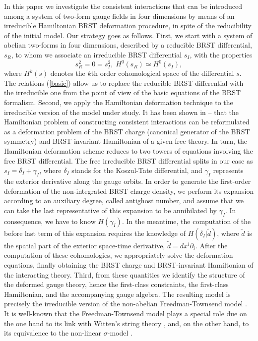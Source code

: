 \documentclass[a4paper,12pt]{article}
\begin{document}
In this paper we investigate the consistent interactions that can be
introduced among a system of two-form gauge fields in four dimensions by
means of an irreducible Hamiltonian BRST deformation procedure, in spite of
the reducibility of the initial model. Our strategy goes as follows. First,
we start with a system of abelian two-forms in four dimensions, described by
a reducible BRST differential, $s_{R}$, to whom we associate an irreducible
BRST differential $s_{I}$, with the properties 
\begin{equation}
s_{R}^{2}=0=s_{I}^{2},\;H^{0}\left( s_{R}\right) \simeq H^{0}\left(
s_{I}\right) ,  \label{basic}
\end{equation}
where $H^{k}\left( s\right) $ denotes the $k$th order cohomological space of
the differential $s$. The relations (\ref{basic}) allow us to replace the
reducible BRST differential with the irreducible one from the point of view
of the basic equations of the BRST formalism. Second, we apply the
Hamiltonian deformation technique to the irreducible version of the model
under study. It has been shown in \cite{25}--\cite{28} that the Hamiltonian
problem of constructing consistent interactions can be reformulated as a
deformation problem of the BRST charge (canonical generator of the BRST
symmetry) and BRST-invariant Hamiltonian of a given free theory. In turn,
the Hamiltonian deformation scheme reduces to two towers of equations
involving the free BRST differential. The free irreducible BRST differential
splits in our case as $s_{I}=\delta _{I}+\gamma _{I}$, where $\delta _{I}$
stands for the Koszul-Tate differential, and $\gamma _{I}$ represents the
exterior derivative along the gauge orbits. In order to generate the
first-order deformation of the non-integrated BRST charge density, we
perform its expansion according to an auxiliary degree, called antighost
number, and assume that we can take the last representative of this
expansion to be annihilated by $\gamma _{I}$. In consequence, we have to
know $H\left( \gamma _{I}\right) $. In the meantime, the computation of the
before last term of this expansion requires the knowledge of $H\left( \delta
_{I}|\tilde{d}\right) $, where $\tilde{d}$ is the spatial part of the
exterior space-time derivative, $\tilde{d}=dx^{i}\partial _{i}$. After the
computation of these cohomologies, we appropriately solve the deformation
equations, finally obtaining the BRST charge and BRST-invariant Hamiltonian
of the interacting theory. Third, from these quantities we identify the
structure of the deformed gauge theory, hence the first-class constraints,
the first-class Hamiltonian, and the accompanying gauge algebra. The
resulting model is precisely the irreducible version of the non-abelian
Freedman-Townsend model \cite{29}. It is well-known that the
Freedman-Townsend model plays a special role due on the one hand to its link
with Witten's string theory \cite{30}, and, on the other hand, to its
equivalence to the non-linear $\sigma $-model \cite{29}.
\end{document}
